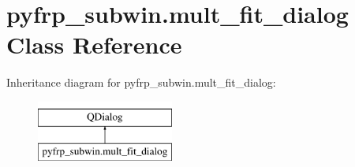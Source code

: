 \hypertarget{classpyfrp__subwin_1_1mult__fit__dialog}{\section{pyfrp\+\_\+subwin.\+mult\+\_\+fit\+\_\+dialog Class Reference}
\label{classpyfrp__subwin_1_1mult__fit__dialog}
}
Inheritance diagram for pyfrp\+\_\+subwin.\+mult\+\_\+fit\+\_\+dialog\+:\begin{figure}[H]
\begin{center}
\leavevmode
\includegraphics[height=2.000000cm]{classpyfrp__subwin_1_1mult__fit__dialog}
\end{center}
\end{figure}
